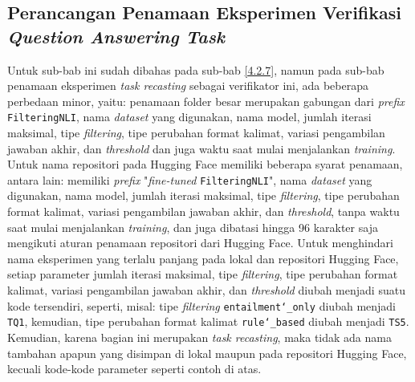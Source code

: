 \subsection{Perancangan Penamaan Eksperimen Verifikasi \emph{Question Answering Task}}
\label{4.4.7}
Untuk sub-bab ini sudah dibahas pada sub-bab \ref{4.2.7}, namun pada sub-bab penamaan eksperimen \emph{task recasting} sebagai verifikator ini, ada beberapa perbedaan minor, yaitu: penamaan folder besar merupakan gabungan dari \emph{prefix} \texttt{FilteringNLI}, nama \emph{dataset} yang digunakan, nama model, jumlah iterasi maksimal, tipe \emph{filtering}, tipe perubahan format kalimat, variasi pengambilan jawaban akhir, dan \emph{threshold} dan juga waktu saat mulai menjalankan \emph{training}. Untuk nama repositori pada Hugging Face memiliki beberapa syarat penamaan, antara lain: memiliki \emph{prefix} "\emph{fine-tuned} \texttt{FilteringNLI}", nama \emph{dataset} yang digunakan, nama model, jumlah iterasi maksimal, tipe \emph{filtering}, tipe perubahan format kalimat, variasi pengambilan jawaban akhir, dan \emph{threshold}, tanpa waktu saat mulai menjalankan \emph{training}, dan juga dibatasi hingga 96 karakter saja mengikuti aturan penamaan repositori dari Hugging Face. Untuk menghindari nama eksperimen yang terlalu panjang pada lokal dan repositori Hugging Face, setiap parameter jumlah iterasi maksimal, tipe \emph{filtering}, tipe perubahan format kalimat, variasi pengambilan jawaban akhir, dan \emph{threshold} diubah menjadi suatu kode tersendiri, seperti, misal: tipe \emph{filtering} \texttt{entailment\char`_only} diubah menjadi \texttt{TQ1}, kemudian, tipe perubahan format kalimat \texttt{rule\char`_based} diubah menjadi \texttt{TS5}. Kemudian, karena bagian ini merupakan \emph{task recasting}, maka tidak ada nama tambahan apapun yang disimpan di lokal maupun pada repositori Hugging Face, kecuali kode-kode parameter seperti contoh di atas.

